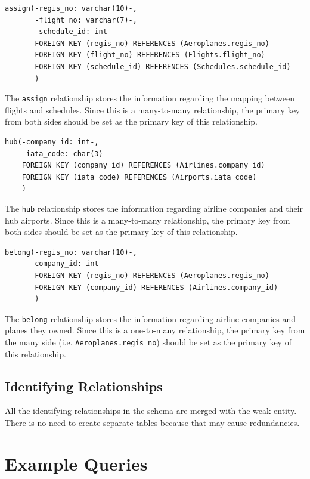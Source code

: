 \documentclass{article}
\begin{document}
	\begin{lstlisting}[keepspaces=true]		
assign(-regis_no: varchar(10)-,
       -flight_no: varchar(7)-,
       -schedule_id: int-
       FOREIGN KEY (regis_no) REFERENCES (Aeroplanes.regis_no)
       FOREIGN KEY (flight_no) REFERENCES (Flights.flight_no)
       FOREIGN KEY (schedule_id) REFERENCES (Schedules.schedule_id)
       )
	\end{lstlisting}    
	The \texttt{assign} relationship stores the information regarding the mapping between flights and schedules. Since this is a many-to-many relationship, the primary key from both sides should be set as the primary key of this relationship.

	\begin{lstlisting}[keepspaces=true]	
hub(-company_id: int-,
    -iata_code: char(3)-
    FOREIGN KEY (company_id) REFERENCES (Airlines.company_id)
    FOREIGN KEY (iata_code) REFERENCES (Airports.iata_code)
    )
	\end{lstlisting}    
	The \texttt{hub} relationship stores the information regarding airline companies and their hub airports. Since this is a many-to-many relationship, the primary key from both sides should be set as the primary key of this relationship.

	\begin{lstlisting}[keepspaces=true]	
belong(-regis_no: varchar(10)-,
       company_id: int
       FOREIGN KEY (regis_no) REFERENCES (Aeroplanes.regis_no)
       FOREIGN KEY (company_id) REFERENCES (Airlines.company_id)
       )
	\end{lstlisting}
    The \texttt{belong} relationship stores the information regarding airline companies and planes they owned. Since this is a one-to-many relationship, the primary key from the many side (i.e. \texttt{Aeroplanes.regis\_no}) should be set as the primary key of this relationship.
	
	\subsection{Identifying Relationships}
	
	All the identifying relationships in the schema are merged with the weak entity. There is no need to create separate tables because that may cause redundancies.
	
	\section{Example Queries}
	
\end{document}
